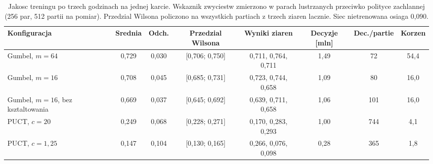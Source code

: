 \begin{table}[htbp]
  \centering
  \caption{Jakosc treningu po trzech godzinach na jednej karcie. Wskaznik
    zwyciestw zmierzono w parach lustrzanych przeciwko polityce zachlannej
    (256 par, 512 partii na pomiar). Przedzial Wilsona policzono na wszystkich
    partiach z trzech ziaren lacznie. Siec nietrenowana osiaga 0{,}090.}
  \label{tab:jakosc-treningu}
  \begin{tabular}{lccccccc}
    \toprule
    Konfiguracja & Srednia & Odch. & Przedzial Wilsona & Wyniki ziaren &
    Decyzje [mln] & Dec./partie & Korzen \\
    \midrule
    Gumbel, $m=64$ & 0{,}729 & 0{,}030 & [0{,}706; 0{,}750] & 0{,}711, 0{,}764, 0{,}711 & 1{,}49 & 72 & 54{,}4 \\
    Gumbel, $m=16$ & 0{,}708 & 0{,}045 & [0{,}685; 0{,}731] & 0{,}723, 0{,}744, 0{,}658 & 1{,}09 & 80 & 16{,}0 \\
    Gumbel, $m=16$, bez ksztaltowania & 0{,}669 & 0{,}037 & [0{,}645; 0{,}692] & 0{,}639, 0{,}711, 0{,}658 & 1{,}06 & 101 & 16{,}0 \\
    PUCT, $c=20$ & 0{,}249 & 0{,}068 & [0{,}228; 0{,}271] & 0{,}170, 0{,}283, 0{,}293 & 1{,}00 & 744 & 4{,}1 \\
    PUCT, $c=1{,}25$ & 0{,}147 & 0{,}104 & [0{,}130; 0{,}165] & 0{,}266, 0{,}076, 0{,}098 & 0{,}28 & 365 & 1{,}8 \\
    \bottomrule
  \end{tabular}
\end{table}
